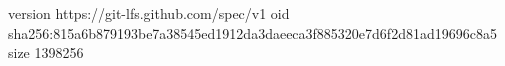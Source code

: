 version https://git-lfs.github.com/spec/v1
oid sha256:815a6b879193be7a38545ed1912da3daeeca3f885320e7d6f2d81ad19696c8a5
size 1398256
